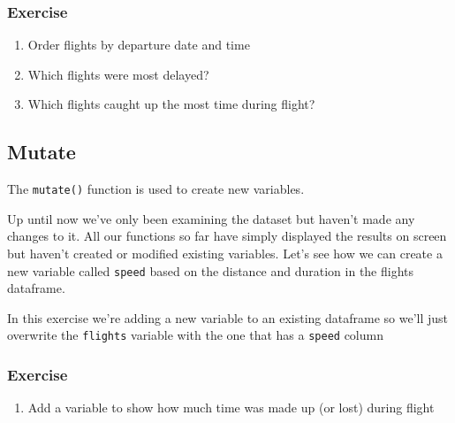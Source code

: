 \documentclass[]{article}
\newenvironment{Shaded}{\begin{snugshade}}{\end{snugshade}}
\newcommand{\KeywordTok}[1]{\textcolor[rgb]{0.13,0.29,0.53}{\textbf{{#1}}}}
\newcommand{\DataTypeTok}[1]{\textcolor[rgb]{0.13,0.29,0.53}{{#1}}}
\newcommand{\DecValTok}[1]{\textcolor[rgb]{0.00,0.00,0.81}{{#1}}}
\newcommand{\StringTok}[1]{\textcolor[rgb]{0.31,0.60,0.02}{{#1}}}
\newcommand{\NormalTok}[1]{{#1}}
\providecommand{\tightlist}{%
  \setlength{\itemsep}{0pt}\setlength{\parskip}{0pt}}
\theoremstyle{definition}
\theoremstyle{definition}
\theoremstyle{definition}
\theoremstyle{remark}
\begin{document}
\subsubsection{Exercise}\label{exercise-1}

\begin{enumerate}
\def\labelenumi{\arabic{enumi}.}
\tightlist
\item
  Order flights by departure date and time
\item
  Which flights were most delayed?
\item
  Which flights caught up the most time during flight?
\end{enumerate}

\subsection{Mutate}\label{mutate}

The \texttt{mutate()} function is used to create new variables.

Up until now we've only been examining the dataset but haven't made any
changes to it. All our functions so far have simply displayed the
results on screen but haven't created or modified existing variables.
Let's see how we can create a new variable called \texttt{speed} based
on the distance and duration in the flights dataframe.

In this exercise we're adding a new variable to an existing dataframe so
we'll just overwrite the \texttt{flights} variable with the one that has
a \texttt{speed} column

\begin{Shaded}
\end{Shaded}

\subsubsection{Exercise}\label{exercise-2}

\begin{enumerate}
\def\labelenumi{\arabic{enumi}.}
\tightlist
\item
  Add a variable to show how much time was made up (or lost) during
  flight
\end{enumerate}
\end{document}
